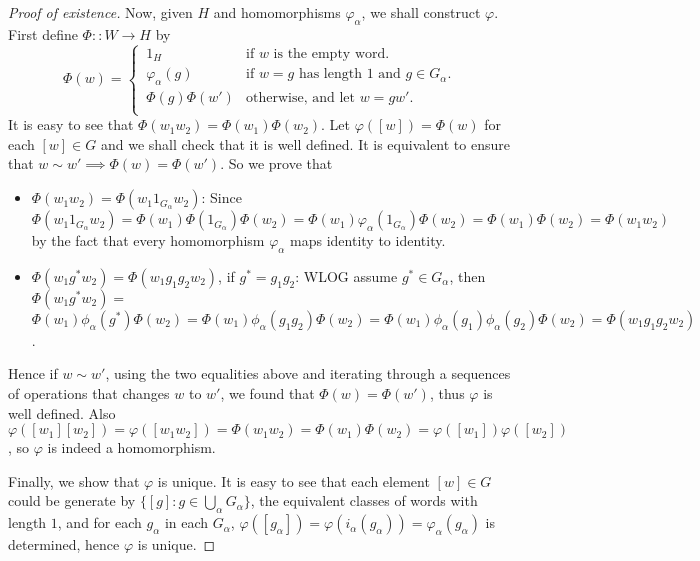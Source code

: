 \documentclass[a4paper,titlepage]{article}
\theoremstyle{remark}
\theoremstyle{definition}
\theoremstyle{definition}
\theoremstyle{plain}
\begin{document}
\begin{proof}[Proof of existence]
    Now, given $H$ and homomorphisms $\varphi_\alpha$, we shall construct $\varphi$. First define 
    $\Phi :: W \to H$ by
    \[ 
      \Phi(w) =
      \begin{cases}
        \, 1_H & \text{if } w \text{ is the empty word.} \\
        \, \varphi_\alpha(g) & \text{if } w = g \text{ has length 1 and } g \in G_\alpha. \\ 
        \, \Phi(g) \Phi(w') & \text{otherwise, and let } w = g w'. \\ 
      \end{cases}
    \]
    It is easy to see that $\Phi(w_1 w_2) = \Phi(w_1) \Phi(w_2)$. Let $\varphi([w]) = \Phi(w)$ for
    each $[w] \in G$ and we shall check that it is well defined. It is equivalent to
    ensure that $w \sim w' \implies \Phi(w) = \Phi(w')$. So we prove that
    \begin{itemize}
      \item $\Phi(w_1 w_2) = \Phi(w_1 1_{G_\alpha} w_2)$: Since $\Phi(w_1 1_{G_\alpha} w_2) 
        = \Phi(w_1) \Phi(1_{G_\alpha}) \Phi(w_2) = \Phi(w_1) \varphi_\alpha(1_{G_\alpha}) \Phi(w_2)
        = \Phi(w_1) \Phi(w_2) = \Phi(w_1 w_2)$ by the fact that every homomorphism $\varphi_\alpha$ maps
        identity to identity.
      \item $\Phi(w_1 g^* w_2) = \Phi(w_1 g_1 g_2 w_2)$, if $g^* = g_1 g_2$: WLOG assume $g^* \in G_\alpha$, then 
        $\Phi(w_1 g^* w_2) = $ \\
        $ \Phi(w_1) \phi_\alpha(g^*) \Phi(w_2) = \Phi(w_1) \phi_\alpha(g_1 g_2) \Phi(w_2)
        = \Phi(w_1) \phi_\alpha(g_1) \phi_\alpha(g_2) \Phi(w_2) = \Phi(w_1 g_1 g_2 w_2)$. 
    \end{itemize}
    Hence if $w \sim w'$, using the two equalities above and iterating through a sequences of
    operations that changes $w$ to $w'$, we found that $\Phi(w) = \Phi(w')$, thus $\varphi$ is
    well defined. Also $\varphi([w_1][w_2]) = \varphi([w_1 w_2]) = \Phi(w_1 w_2) = \Phi(w_1) \Phi(w_2)
    = \varphi([w_1]) \varphi([w_2])$, so $\varphi$ is indeed a homomorphism.

    Finally, we show that $\varphi$ is unique. It is easy to see that each element
    $[w] \in G$ could be generate by $\big\{[g] : g \in \bigcup_\alpha G_\alpha\big\}$,
    the equivalent classes of words with length $1$, 
    and for each $g_\alpha$ in each $G_\alpha$, $\varphi([g_\alpha]) = \varphi(i_\alpha(g_\alpha)) =
    \varphi_\alpha(g_\alpha)$ is determined, hence $\varphi$ is unique.
  \end{proof}
\end{document}
